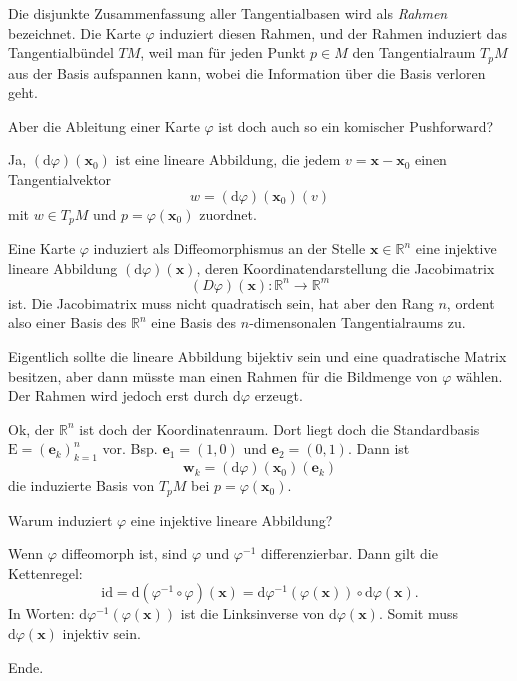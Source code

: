 \documentclass{beamer}
\newcommand{\R}{\mathbb R}
\begin{document}
\begin{frame}
Die disjunkte Zusammenfassung aller Tangentialbasen wird als
\emph{Rahmen} bezeichnet. Die Karte $\varphi$ induziert diesen
Rahmen, und der Rahmen induziert das Tangentialbündel $TM$, weil
man für jeden Punkt $p\in M$ den Tangentialraum $T_pM$ aus der Basis
aufspannen kann, wobei die Information über die Basis verloren geht.
\end{frame}

\begin{frame}
Aber die Ableitung einer Karte $\varphi$ ist doch auch so ein
komischer Pushforward?
\end{frame}

\begin{frame}
Ja, $(\mathrm d\varphi)(\mathbf x_0)$ ist eine lineare Abbildung,
die jedem $v=\mathbf x-\mathbf x_0$ einen Tangentialvektor
\[w = (\mathrm d\varphi)(\mathbf x_0)(v)\]
mit $w\in T_pM$ und $p=\varphi(\mathbf x_0)$ zuordnet.
\end{frame}

\begin{frame}
Eine Karte $\varphi$ induziert als Diffeomorphismus an der Stelle
$\mathbf x\in\R^n$ eine injektive lineare
Abbildung $(\mathrm d\varphi)(\mathbf x)$, deren Koordinatendarstellung die
Jacobimatrix
\[(D\varphi)(\mathbf x)\colon\R^n\to\R^m\]
ist.
Die Jacobimatrix muss nicht quadratisch sein, hat aber den Rang $n$,
ordent also einer Basis des $\R^n$ eine Basis des $n$-dimensonalen
Tangentialraums zu.
\end{frame}

\begin{frame}
Eigentlich sollte die lineare Abbildung bijektiv sein und eine quadratische
Matrix besitzen, aber dann müsste
man einen Rahmen für die Bildmenge von $\varphi$ wählen. Der Rahmen
wird jedoch erst durch $\mathrm d\varphi$ erzeugt.
\end{frame}

\begin{frame}
Ok, der $\R^n$ ist doch der Koordinatenraum. Dort liegt doch die
Standardbasis $\mathrm E=(\mathbf e_k)_{k=1}^n$ vor. Bsp.
$\mathbf e_1=(1,0)$ und $\mathbf e_2=(0,1)$. Dann ist
\[\mathbf w_k = (\mathrm d\varphi)(\mathbf x_0)(\mathbf e_k)\]
die induzierte Basis von $T_pM$ bei $p=\varphi(\mathbf x_0)$.
\end{frame}

\begin{frame}
Warum induziert $\varphi$ eine injektive lineare Abbildung?
\end{frame}

\begin{frame}
Wenn $\varphi$ diffeomorph ist, sind $\varphi$ und $\varphi^{-1}$
differenzierbar. Dann gilt die Kettenregel:
\[\mathrm{id} = \mathrm d(\varphi^{-1}\circ\varphi)(\mathbf x)
= \mathrm d\varphi^{-1}(\varphi(\mathbf x))\circ\mathrm d\varphi(\mathbf x).\]
In Worten: $\mathrm d\varphi^{-1}(\varphi(\mathbf x))$ ist die
Linksinverse von $\mathrm d\varphi(\mathbf x)$. Somit muss
$\mathrm d\varphi(\mathbf x)$ injektiv sein.
\end{frame}

\begin{frame}
Ende.
\end{frame}
\end{document}
